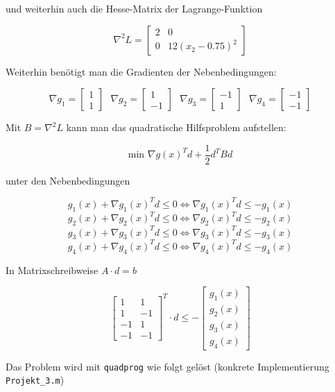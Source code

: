 \documentclass[a4paper, 12pt]{report}
\begin{document}
und weiterhin auch die Hesse-Matrix der Lagrange-Funktion

$$\nabla^2L = \begin{bmatrix}2 & 0\\0 & 12(x_2 - 0.75)^2\end{bmatrix}$$

Weiterhin benötigt man die Gradienten der Nebenbedingungen:

$$\nabla g_1 = \begin{bmatrix}1\\1\end{bmatrix} \text{  } \nabla g_2 = \begin{bmatrix}1\\-1\end{bmatrix} \text{  } \nabla g_3 = \begin{bmatrix}-1\\1\end{bmatrix} \text{  } \nabla g_4 = \begin{bmatrix}-1\\-1\end{bmatrix}$$

Mit $B = \nabla^2L$ kann man das quadratische Hilfsproblem aufstellen:

$$\text{min }\nabla g(x)^Td + \frac{1}{2}d^TBd$$

unter den Nebenbedingungen

$$g_1(x) + \nabla g_1(x)^Td \leq 0 \Leftrightarrow \nabla g_1(x)^Td \leq -g_1(x)$$
$$g_2(x) + \nabla g_2(x)^Td \leq 0 \Leftrightarrow \nabla g_2(x)^Td \leq -g_2(x)$$
$$g_3(x) + \nabla g_3(x)^Td \leq 0 \Leftrightarrow \nabla g_3(x)^Td \leq -g_3(x)$$
$$g_4(x) + \nabla g_4(x)^Td \leq 0 \Leftrightarrow \nabla g_4(x)^Td \leq -g_4(x)$$

In Matrixschreibweise $A\cdot d = b$

$$\begin{bmatrix}1 & 1\\1 & -1\\-1 & 1\\-1 & -1\end{bmatrix}^T\cdot d \leq -\begin{bmatrix}g_1(x)\\g_2(x)\\g_3(x)\\g_4(x)\end{bmatrix}$$

Das Problem wird mit \lstinline[basicstyle=\ttfamily\color{black}]|quadprog| wie folgt gelöst
(konkrete Implementierung \lstinline[basicstyle=\ttfamily\color{black}]|Projekt_3.m|)
\end{document}
